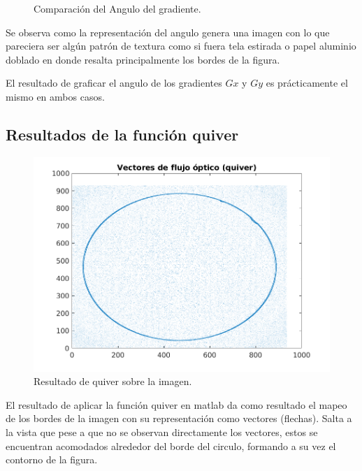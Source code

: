 \documentclass[11pt, letterpaper]{article}
\begin{document}
\begin{figure}[h]
	\caption{Comparación del Angulo del gradiente.}
	\label{fig:comparacion en Gradiente}
\end{figure}		

Se observa como la representación del angulo genera una imagen con lo que pareciera ser algún patrón de textura como si fuera tela estirada o papel aluminio doblado en donde resalta principalmente los bordes de la figura.

El resultado de graficar el angulo de los gradientes $Gx$ y $Gy$ es prácticamente el mismo en ambos casos.

\newpage

\subsection{Resultados de la función quiver}

\begin{figure}[h]
	\centering
	\includegraphics[width=\textwidth]{IMG/quiver.png} %
	\caption{Resultado de quiver sobre la imagen.}
	\label{fig:img10}
	\vspace{0.5cm} %
	\label{fig:Quiver}
\end{figure}

El resultado de aplicar la función quiver en matlab da como resultado el mapeo de los bordes de la imagen con su representación como vectores (flechas). Salta a la vista que pese a que no se observan directamente los vectores, estos se encuentran acomodados alrededor del borde del circulo, formando a su vez el contorno de la figura.
\end{document}
